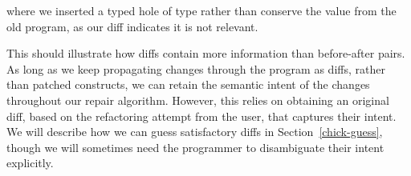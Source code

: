 \noindent where we inserted a typed hole of type  rather than
conserve the value  from the old program, as our diff indicates
it is not relevant.

This should illustrate how diffs contain more information than before-after
pairs.  As long as we keep propagating changes through the program as diffs,
rather than patched constructs, we can retain the semantic intent of the changes
throughout our repair algorithm.  However, this relies on obtaining an original
diff, based on the refactoring attempt from the user, that captures their
intent.  We will describe how we can guess satisfactory diffs in
Section~\ref{chick-guess}, though we will sometimes need the programmer to
disambiguate their intent explicitly.
